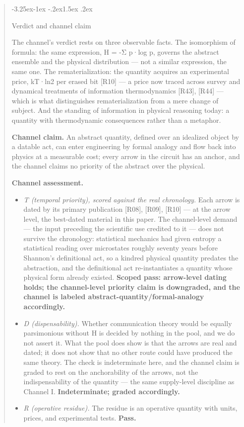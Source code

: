 \documentclass[11pt,a4paper]{article}
\makeatletter
\renewcommand\subsection{\@startsection{subsection}{2}{\z@}%
  {-3.25ex\@plus -1ex \@minus -.2ex}{1.5ex \@plus .2ex}%
  {\normalfont\large\bfseries\raggedright}}
\makeatother
\begin{document}
\begin{abstract}
\subsection{Verdict and channel claim}

The channel's verdict rests on three observable facts. The isomorphism of formula: the same expression, H = -Σ p·log p, governs the abstract ensemble and the physical distribution — not a similar expression, the same one. The rematerialization: the quantity acquires an experimental price, kT·ln2 per erased bit [R10] — a price now traced across survey and dynamical treatments of information thermodynamics [R43], [R44] — which is what distinguishes rematerialization from a mere change of subject. And the standing of information in physical reasoning today: a quantity with thermodynamic consequences rather than a metaphor.

\textbf{Channel claim.} An abstract quantity, defined over an idealized object by a datable act, can enter engineering by formal analogy and flow back into physics at a measurable cost; every arrow in the circuit has an anchor, and the channel claims no priority of the abstract over the physical.

\textbf{Channel assessment.}

\begin{itemize}[leftmargin=1.6em,itemsep=2pt,parsep=0pt,topsep=3pt]
\item \textit{T (temporal priority), scored against the real chronology.} Each arrow is dated by its primary publication [R08], [R09], [R10] — at the arrow level, the best-dated material in this paper. The channel-level demand — the input preceding the scientific use credited to it — does not survive the chronology: statistical mechanics had given entropy a statistical reading over microstates roughly seventy years before Shannon's definitional act, so a kindred physical quantity predates the abstraction, and the definitional act re-instantiates a quantity whose physical form already existed. \textbf{Scoped pass: arrow-level dating holds; the channel-level priority claim is downgraded, and the channel is labeled abstract-quantity/formal-analogy accordingly.}
\item \textit{D (dispensability).} Whether communication theory would be equally parsimonious without H is decided by nothing in the pool, and we do not assert it. What the pool does show is that the arrows are real and dated; it does not show that no other route could have produced the same theory. The check is indeterminate here, and the channel claim is graded to rest on the anchorability of the arrows, not the indispensability of the quantity — the same supply-level discipline as Channel I. \textbf{Indeterminate; graded accordingly.}
\item \textit{R (operative residue).} The residue is an operative quantity with units, prices, and experimental tests. \textbf{Pass.}
\end{itemize}


\end{abstract}
\end{document}

